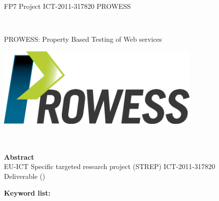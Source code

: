 \begin{center}

\begin{flushright}
	FP7 Project ICT-2011-317820 PROWESS \\[-0.25cm]
\end{flushright}

\HRule \\[0cm]

\begin{flushright}
	PROWESS: Property Based Testing of Web services
\end{flushright}

\includegraphics[width=10cm]{figures/prowess_clr.png} \\[0.5cm]

{\large \color{prowessblue} \cmdDlNumber{} \cmdDlName{}} \\[-0.25cm]
\HRule \\[0cm]
{\color{prowessblue} \cmdNames{}}

\textbf{Abstract} \\
EU-ICT Specific targeted research project (STREP) ICT-2011-317820 \\
Deliverable \cmdDlNumber{} (\cmdWpNumber{})

\begin{flushleft}
	\cmdDlAbstract{}
\end{flushleft}

\HRule

\begin{flushleft}
	{\color{prowessblue} \textbf{Keyword list:} \cmdDlKeywords{}} \\[-0.1cm]
\end{flushleft}

\HRule


\end{center}
